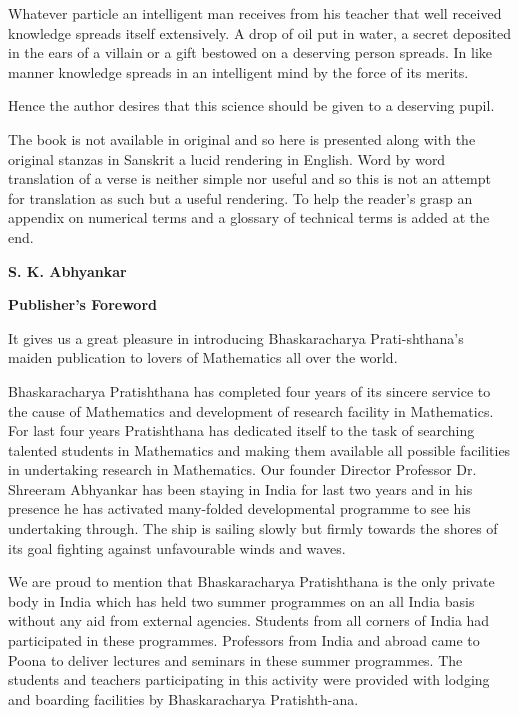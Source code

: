 \documentclass[]{article}
\begin{document}
Whatever particle an intelligent man receives from his teacher that
well received knowledge spreads itself extensively. A drop of oil put in
water, a secret deposited in the ears of a villain or a gift bestowed on
a deserving person spreads. In like manner knowledge spreads in an
intelligent mind by the force of its merits.

Hence the author desires that this science should be given to a
deserving pupil.

The book is not available in original and so here is presented along
with the original stanzas in Sanskrit a lucid rendering in English. Word
by word translation of a verse is neither simple nor useful and so this
is not an attempt for translation as such but a useful rendering. To
help the reader's grasp an appendix on numerical terms and a glossary of
technical terms is added at the end.

\begin{flushright}
\textbf{S. K. Abhyankar}
\end{flushright}
\newpage
\thispagestyle{empty}
\large
{\textbf{\large Publisher's Foreword}}
\vspace{4mm}

It gives us a great pleasure in introducing Bhaskaracharya
Prati-shthana's maiden publication to lovers of Mathematics all over the
world.

Bhaskaracharya Pratishthana has completed four years of its sincere
service to the cause of Mathematics and development of research facility
in Mathematics. For last four years Pratishthana has dedicated itself to
the task of searching talented students in Mathematics and making them
available all possible facilities in undertaking research in
Mathematics. Our founder Director Professor Dr. Shreeram Abhyankar has
been staying in India for last two years and in his presence he has
activated many-folded developmental programme to see his undertaking
through. The ship is sailing slowly but firmly towards the shores of its
goal fighting against unfavourable winds and waves.

We are proud to mention that Bhaskaracharya Pratishthana is the only
private body in India which has held two summer programmes on an all
India basis without any aid from external agencies. Students from all
corners of India had participated in these programmes. Professors from
India and abroad came to Poona to deliver lectures and seminars in these
summer programmes. The students and teachers participating in this
activity were provided with lodging and boarding facilities by
Bhaskaracharya Pratishth-ana.
\end{document}
